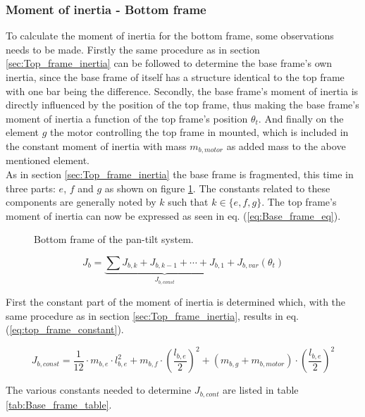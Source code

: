 \documentclass[../../main]{subfiles}
\begin{document}
\subsubsection{Moment of inertia - Bottom frame}
To calculate the moment of inertia for the bottom frame, some observations needs to be made. Firstly the same procedure as in section \ref{sec:Top_frame_inertia} can be followed to determine the base frame's own inertia, since the base frame of itself has a structure identical to the top frame with one bar being the difference. Secondly, the base frame's moment of inertia is directly influenced by the position of the top frame, thus making the base frame's moment of inertia a function of the top frame's position $\theta_t$. And finally on the element $g$ the motor controlling the top frame in mounted, which is included in the constant moment of inertia with mass $m_{b,motor}$ as added mass to the above mentioned element.\\
As in section \ref{sec:Top_frame_inertia} the base frame is fragmented, this time in three parts: $e$, $f$ and $g$ as shown on figure \ref{fig:BottomFrame}. The constants related to these components are generally noted by $k$ such that $k \in \{e,f,g\}$. The top frame's moment of inertia can now be expressed as seen in eq. (\ref{eq:Base_frame_eq}).

\begin{figure}[H]
  \centering
  
  \caption{Bottom frame of the pan-tilt system.}
  \label{fig:BottomFrame}
\end{figure}

\begin{equation}
  \label{eq:Base_frame_eq}
  J_b =
  \underbrace{
  \sum J_{b,k} + J_{b,k-1} + \dotsb + J_{b,1}}_\text{$J_{b,const}$} + J_{b,var}(\theta_t)
\end{equation}

First the constant part of the moment of inertia is determined which, with the same procedure as in section \ref{sec:Top_frame_inertia}, results in eq. (\ref{eq:top_frame_constant}).

\begin{equation}
  \label{eq:top_frame_constant}
  J_{b,const} = \frac{1}{12}\cdot m_{b,e}\cdot l_{b,e}^2 + m_{b,f} \cdot \left( \frac{l_{b,e}}{2} \right)^2 + (m_{b,g}+m_{b,motor}) \cdot \left(\frac{l_{b,e}}{2}\right)^2
\end{equation}

The various constants needed to determine $J_{b,cont}$ are listed in table \ref{tab:Base_frame_table}.
\end{document}
